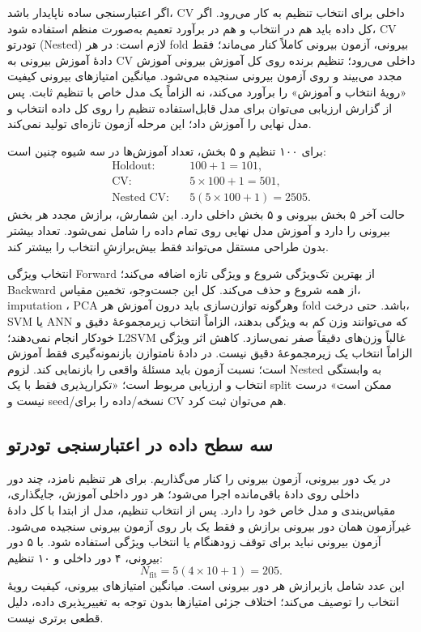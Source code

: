 اگر اعتبارسنجی ساده ناپایدار باشد، CV داخلی برای انتخاب تنظیم به کار می‌رود. اگر کل داده باید هم در انتخاب و هم در برآورد تعمیم به‌صورت منظم استفاده شود، CV تودرتو (Nested) لازم است: در هر fold بیرونی، آزمون بیرونی کاملاً کنار می‌ماند؛ فقط دادهٔ آموزش بیرونی به CV داخلی می‌رود؛ تنظیم برنده روی کل آموزش بیرونی آموزش مجدد می‌بیند و روی آزمون بیرونی سنجیده می‌شود. میانگین امتیازهای بیرونی کیفیت «رویهٔ انتخاب و آموزش» را برآورد می‌کند، نه الزاماً یک مدل خاص با تنظیم ثابت. پس از گزارش ارزیابی می‌توان برای مدل قابل‌استفاده تنظیم را روی کل داده انتخاب و مدل نهایی را آموزش داد؛ این مرحله آزمون تازه‌ای تولید نمی‌کند.

برای ۱۰۰ تنظیم و ۵ بخش، تعداد آموزش‌ها در سه شیوه چنین است:
\begin{align*}
\text{Holdout}:&\quad100+1=101,\\
\text{CV}:&\quad5\times100+1=501,\\
\text{Nested CV}:&\quad5(5\times100+1)=2505.
\end{align*}
حالت آخر ۵ بخش بیرونی و ۵ بخش داخلی دارد. این شمارش، برازش مجدد هر بخش بیرونی را دارد و آموزش مدل نهایی روی تمام داده را شامل نمی‌شود. تعداد بیشتر بدون طراحی مستقل می‌تواند فقط بیش‌برازشِ انتخاب را بیشتر کند.

انتخاب ویژگی Forward از بهترین تک‌ویژگی شروع و ویژگی تازه اضافه می‌کند؛ Backward از همه شروع و حذف می‌کند. کل این جست‌وجو، تخمین مقیاس، imputation ، PCA وهرگونه توازن‌سازی باید درون آموزش هر fold باشد. حتی درخت، SVM یا ANN که می‌توانند وزن کم به ویژگی بدهند، الزاماً انتخاب زیرمجموعهٔ دقیق و خودکار انجام نمی‌دهند؛ L2SVM غالباً وزن‌های دقیقاً صفر نمی‌سازد. کاهش اثر ویژگی الزاماً انتخاب یک زیرمجموعهٔ دقیق نیست. در دادهٔ نامتوازن بازنمونه‌گیری فقط آموزش است؛ نسبت آزمون باید مسئلهٔ واقعی را بازنمایی کند. لزوم Nested به وابستگی انتخاب و ارزیابی مربوط است؛ «تکرارپذیری فقط با یک split ممکن است» درست نیست و seed/نسخه/داده را برای CV هم می‌توان ثبت کرد.



\subsection*{سه سطح داده در اعتبارسنجی تودرتو}
در یک دور بیرونی، آزمون بیرونی را کنار می‌گذاریم. برای هر تنظیم نامزد، چند دور داخلی روی دادهٔ باقی‌مانده اجرا می‌شود؛ هر دور داخلی آموزش، جایگذاری، مقیاس‌بندی و مدل خاص خود را دارد. پس از انتخاب تنظیم، مدل از ابتدا با کل دادهٔ غیرآزمون همان دور بیرونی برازش و فقط یک بار روی آزمون بیرونی سنجیده می‌شود. آزمون بیرونی نباید برای توقف زودهنگام یا انتخاب ویژگی استفاده شود. با ۵ دور بیرونی، ۴ دور داخلی و ۱۰ تنظیم:
\[N_{\mathrm{fit}}=5(4\times10+1)=205.\]
این عدد شامل بازبرازش هر دور بیرونی است. میانگین امتیازهای بیرونی، کیفیت رویهٔ انتخاب را توصیف می‌کند؛ اختلاف جزئی امتیازها بدون توجه به تغییرپذیری داده، دلیل قطعی برتری نیست.

